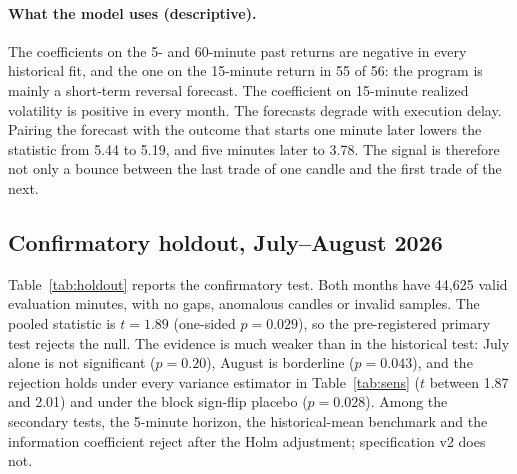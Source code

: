 \documentclass[11pt]{article}
\begin{document}
\paragraph{What the model uses (descriptive).} The coefficients on the 5- and 60-minute past returns are negative in every historical fit, and the one on the 15-minute return in 55 of 56: the program is mainly a short-term reversal forecast. The coefficient on 15-minute realized volatility is positive in every month. The forecasts degrade with execution delay. Pairing the forecast with the outcome that starts one minute later lowers the statistic from 5.44 to 5.19, and five minutes later to 3.78. The signal is therefore not only a bounce between the last trade of one candle and the first trade of the next.

\subsection{Confirmatory holdout, July--August 2026}
Table~\ref{tab:holdout} reports the confirmatory test. Both months have 44,625 valid evaluation minutes, with no gaps, anomalous candles or invalid samples. The pooled statistic is $t=1.89$ (one-sided $p=0.029$), so the pre-registered primary test rejects the null. The evidence is much weaker than in the historical test: July alone is not significant ($p=0.20$), August is borderline ($p=0.043$), and the rejection holds under every variance estimator in Table~\ref{tab:sens} ($t$ between 1.87 and 2.01) and under the block sign-flip placebo ($p=0.028$). Among the secondary tests, the 5-minute horizon, the historical-mean benchmark and the information coefficient reject after the Holm adjustment; specification v2 does not.
\end{document}
